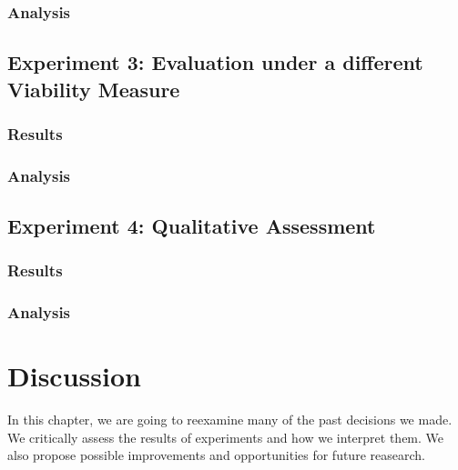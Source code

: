 \documentclass[12pt,a4paper]{report}
\begin{document}
\subsection{Analysis}




\section{Experiment 3: Evaluation under a different Viability Measure}
\subsection{Results}

\subsection{Analysis}


\section{Experiment 4: Qualitative Assessment}
\subsection{Results}

\subsection{Analysis}



\chapter{Discussion}
\label{sec:dicussion}
In this chapter, we are going to reexamine many of the past decisions we made. We critically assess the results of experiments and how we interpret them. We also propose possible improvements and opportunities for future reasearch.
\end{document}
